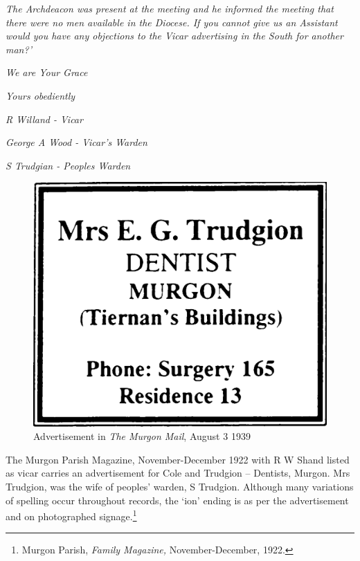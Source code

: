 \emph{The Archdeacon was present at the meeting and he informed the meeting that there were no men available in the Diocese. If you cannot give us an Assistant would you have any objections to the Vicar advertising in the South for another man?'}



\emph{We are Your Grace}



\emph{Yours obediently}



\emph{R Willand - Vicar}



\emph{George A Wood - Vicar's Warden}



\emph{S Trudgian - Peoples Warden}



\medskip








\begin{figure}
\begin{center}
\includegraphics[width=.6\linewidth,center]{../images/trudgionAd.jpg}
\caption{Advertisement in \emph{The Murgon Mail}, August 3 1939}
\end{center}
\end{figure}




The Murgon Parish Magazine, November-December 1922 with R W Shand listed as vicar carries an advertisement for Cole and Trudgion -- Dentists, Murgon. Mrs Trudgion, was the wife of peoples' warden, S Trudgion. Although many variations of spelling occur throughout records, the `ion' ending is as per the advertisement and on photographed signage.\footnote{Murgon Parish, \emph{Family Magazine,} November-December, 1922.}


